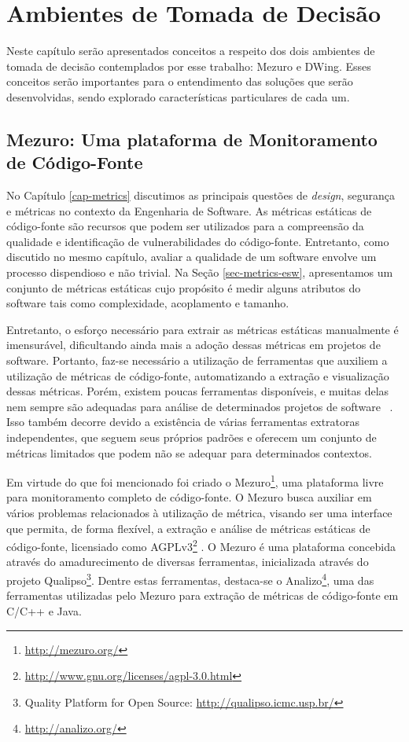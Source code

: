 \chapter{Ambientes de Tomada de Decisão}


%

Neste capítulo serão apresentados conceitos a respeito dos dois ambientes de tomada de decisão contemplados por esse trabalho: Mezuro e DWing. Esses conceitos serão importantes para o entendimento das soluções que serão desenvolvidas, sendo explorado características particulares de cada um.

%

\section{Mezuro: Uma plataforma de Monitoramento de Código-Fonte}
\label{cap-mezuro}

No Capítulo \ref{cap-metrics} discutimos as principais questões de \emph{design}, segurança e métricas no contexto da Engenharia de Software. As métricas estáticas de código-fonte são recursos que podem ser utilizados para a compreensão da qualidade e identificação de vulnerabilidades do código-fonte. Entretanto, como discutido no mesmo capítulo, avaliar a qualidade de um software envolve um processo dispendioso e não trivial. Na Seção \ref{sec-metrics-esw}, apresentamos um conjunto de métricas estáticas cujo propósito é medir alguns atributos do software tais como complexidade, acoplamento e tamanho. 

%

Entretanto, o esforço necessário para extrair as métricas estáticas manualmente é imensurável, dificultando ainda mais a adoção dessas métricas em projetos de software.
%
Portanto, faz-se necessário a utilização de ferramentas que auxiliem a utilização de métricas de código-fonte, automatizando a extração e visualização dessas métricas.
%
Porém, existem poucas ferramentas disponíveis, e muitas delas nem sempre são adequadas para análise de determinados projetos de software ~\cite{meirelles2010mezuro}.
%
Isso também decorre devido a existência de várias ferramentas extratoras independentes, que seguem seus próprios padrões e oferecem um conjunto de métricas limitados que podem não se adequar para determinados contextos.

%

Em virtude do que foi mencionado foi criado o Mezuro\footnote{\url{http://mezuro.org/}}, uma plataforma livre para monitoramento completo de código-fonte. O Mezuro busca auxiliar em vários problemas relacionados à utilização de métrica, visando ser uma interface que permita, de forma flexível, a extração e análise de métricas estáticas de código-fonte, licensiado como AGPLv3\footnote{\url{http://www.gnu.org/licenses/agpl-3.0.html}} \cite{manzo2014}. O Mezuro é uma plataforma concebida através do amadurecimento de diversas ferramentas, inicializada através do projeto Qualipso\footnote{Quality Platform for Open Source: \url{http://qualipso.icmc.usp.br/}}. Dentre estas ferramentas, destaca-se o Analizo\footnote{\url{http://analizo.org/}}, uma das ferramentas utilizadas pelo Mezuro para extração de métricas de código-fonte em C/C++ e Java.


